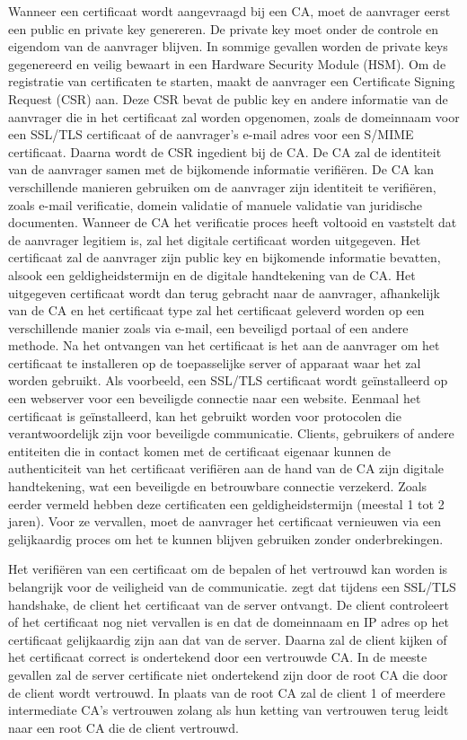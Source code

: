 Wanneer een certificaat wordt aangevraagd bij een CA, moet de aanvrager eerst een public en private key genereren. De private key moet onder de controle en eigendom van de aanvrager blijven. In sommige gevallen worden de private keys gegenereerd en veilig bewaart in een Hardware Security Module (HSM). \autocite{SSLcom}
Om de registratie van certificaten te starten, maakt de aanvrager een Certificate Signing Request (CSR) aan. Deze CSR bevat de public key en andere informatie van de aanvrager die in het certificaat zal worden opgenomen, zoals de domeinnaam voor een SSL/TLS certificaat of de aanvrager's e-mail adres voor een S/MIME certificaat.
Daarna wordt de CSR ingedient bij de CA. De CA zal de identiteit van de aanvrager samen met de bijkomende informatie verifiëren. De CA kan verschillende manieren gebruiken om de aanvrager zijn identiteit te verifiëren, zoals e-mail verificatie, domein validatie of manuele validatie van juridische documenten.
Wanneer de CA het verificatie proces heeft voltooid en vaststelt dat de aanvrager legitiem is, zal het digitale certificaat worden uitgegeven. Het certificaat zal de aanvrager zijn public key en bijkomende informatie bevatten, alsook een geldigheidstermijn en de digitale handtekening van de CA.
Het uitgegeven certificaat wordt dan terug gebracht naar de aanvrager, afhankelijk van de CA en het certificaat type zal het certificaat geleverd worden op een verschillende manier zoals via e-mail, een beveiligd portaal of een andere methode.
Na het ontvangen van het certificaat is het aan de aanvrager om het certificaat te installeren op de toepasselijke server of apparaat waar het zal worden gebruikt. Als voorbeeld, een SSL/TLS certificaat wordt geïnstalleerd op een webserver voor een beveiligde connectie naar een website.
Eenmaal het certificaat is geïnstalleerd, kan het gebruikt worden voor protocolen die verantwoordelijk zijn voor beveiligde communicatie. Clients, gebruikers of andere entiteiten die in contact komen met de certificaat eigenaar kunnen de authenticiteit van het certificaat verifiëren aan de hand van de CA zijn digitale handtekening, wat een beveiligde en betrouwbare connectie verzekerd.
Zoals eerder vermeld hebben deze certificaten een geldigheidstermijn (meestal 1 tot 2 jaren). Voor ze vervallen, moet de aanvrager het certificaat vernieuwen via een gelijkaardig proces om het te kunnen blijven gebruiken zonder onderbrekingen. \autocite{EncCon} \break

Het verifiëren van een certificaat om de bepalen of het vertrouwd kan worden is belangrijk voor de veiligheid van de communicatie.
\Textcite{okta} zegt dat tijdens een SSL/TLS handshake, de client het certificaat van de server ontvangt. De client controleert of het certificaat nog niet vervallen is en dat de domeinnaam en IP adres op het certificaat gelijkaardig zijn aan dat van de server. Daarna zal de client kijken of het certificaat correct is ondertekend door een vertrouwde CA.
In de meeste gevallen zal de server certificate niet ondertekend zijn door de root CA die door de client wordt vertrouwd. In plaats van de root CA zal de client 1 of meerdere intermediate CA's vertrouwen zolang als hun ketting van vertrouwen terug leidt naar een root CA die de client vertrouwd.

